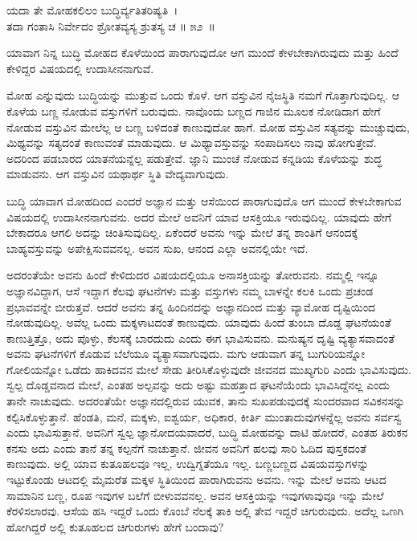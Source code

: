 \begin{shloka}
ಯದಾ ತೇ ಮೋಹಕಲಿಲಂ ಬುದ್ಧಿರ್ವ್ಯತಿತರಿಷ್ಯತಿ~।\\ತದಾ ಗಂತಾಸಿ ನಿರ್ವೇದಂ ಶ್ರೋತವ್ಯಸ್ಯ ಶ್ರುತಸ್ಯ ಚ \hfill॥ ೫೨~॥
\end{shloka}

\begin{artha}
ಯಾವಾಗ ನಿನ್ನ ಬುದ್ಧಿ ಮೋಹದ ಕೊಳೆಯಿಂದ ಪಾರಾಗುವುದೋ ಆಗ ಮುಂದೆ ಕೇಳಬೇಕಾಗಿರುವುದು ಮತ್ತು ಹಿಂದೆ ಕೇಳಿದ್ದರ ವಿಷಯದಲ್ಲಿ ಉದಾಸೀನನಾಗುವೆ.
\end{artha}

ಮೋಹ ಎನ್ನುವುದು ಬುದ್ಧಿಯನ್ನು ಮುತ್ತುವ ಒಂದು ಕೊಳೆ. ಆಗ ವಸ್ತುವಿನ ನೈಜಸ್ಥಿತಿ ನಮಗೆ ಗೊತ್ತಾಗುವುದಿಲ್ಲ. ಆ ಕೊಳೆಯ ಬಣ್ಣ ನೋಡುವ ವಸ್ತುಗಳಿಗೆ ಬರುವುದು. ನಾವೊಂದು ಬಣ್ಣದ ಗಾಜಿನ ಮೂಲಕ ನೋಡಿದಾಗ ಹೇಗೆ ನೋಡುವ ವಸ್ತುವಿನ ಮೇಲೆಲ್ಲ ಆ ಬಣ್ಣ ಬಳಿದಂತೆ ಕಾಣುವುದೋ ಹಾಗೆ. ಮೋಹ ವಸ್ತುವಿನ ಸತ್ಯವನ್ನು ಮುಚ್ಚುವುದು, ಮಿಥ್ಯವನ್ನು ಸತ್ಯದಂತೆ ಕಾಣುವಂತೆ ಮಾಡುವುದು. ಆ ಮಿಥ್ಯಾವಸ್ತುವನ್ನು ಸಂಪಾದಿಸಲು ನಾವು ಹೋಗುತ್ತೇವೆ. ಅದರಿಂದ ಪಡಬಾರದ ಯಾತನೆಯನ್ನೆಲ್ಲ ಪಡುತ್ತೇವೆ. ಜ್ಞಾನಿ ಮುಂಚೆ ನೋಡುವ ಕನ್ನಡಿಯ ಕೊಳೆಯನ್ನು ಶುದ್ಧ ಮಾಡುವನು. ಆಗ ವಸ್ತುವಿನ ಯಥಾರ್ಥ ಸ್ಥಿತಿ ವೇದ್ಯವಾಗುವುದು.

ಬುದ್ಧಿ ಯಾವಾಗ ಮೋಹದಿಂದ ಎಂದರೆ ಅಜ್ಞಾನ ಮತ್ತು ಆಸೆಯಿಂದ ಪಾರಾಗುವುದೊ ಆಗ ಮುಂದೆ ಕೇಳಬೇಕಾಗುವ ವಿಷಯದಲ್ಲಿ ಉದಾಸೀನನಾಗುವನು. ಅದರ ಮೇಲೆ ಅವನಿಗೆ ಯಾವ ಆಸಕ್ತಿಯೂ ಇರುವುದಿಲ್ಲ. ಯಾವುದು ಹೇಗೆ ಬೇಕಾದರೂ ಆಗಲಿ ಅದನ್ನು ಚಿಂತಿಸುವುದಿಲ್ಲ. ಏಕೆಂದರೆ ಅವನು ಇನ್ನು ಮೇಲೆ ತನ್ನ ಶಾಂತಿಗೆ ಆನಂದಕ್ಕೆ ಬಾಹ್ಯವಸ್ತುವನ್ನು ಅಪೇಕ್ಷಿಸುವವನಲ್ಲ. ಅವನ ಸುಖ, ಆನಂದ ಎಲ್ಲಾ ಅವನಲ್ಲಿಯೇ ಇದೆ.

ಅದರಂತೆಯೇ ಅವನು ಹಿಂದೆ ಕೇಳಿದುದರ ವಿಷಯದಲ್ಲಿಯೂ ಅನಾಸಕ್ತಿಯನ್ನು ತೋರುವನು. ನಮ್ಮಲ್ಲಿ ಇನ್ನೂ ಅಜ್ಞಾನವಿದ್ದಾಗ, ಆಸೆ ಇದ್ದಾಗ ಕೆಲವು ಘಟನೆಗಳು ಮತ್ತು ವಸ್ತುಗಳು ನಮ್ಮ ಬಾಳನ್ನೇ ಕಲಕಿ ಒಂದು ಪ್ರಚಂಡ ಪ್ರಭಾವವನ್ನೇ ಬೀರುತ್ತವೆ. ಆದರೆ ಅವನು ತನ್ನ ಹಿಂದಿನದನ್ನು ಅಜ್ಞಾನದಿಂದ ಮತ್ತು ವ್ಯಾಮೋಹ ದೃಷ್ಟಿಯಿಂದ ನೋಡುವುದಿಲ್ಲ. ಅವೆಲ್ಲ ಒಂದು ಮಕ್ಕಳಾಟದಂತೆ ಕಾಣುವುದು. ಯಾವುದು ಹಿಂದೆ ತುಂಬಾ ದೊಡ್ಡ ಘಟನೆಯಂತೆ ಕಾಣುತ್ತಿತ್ತೊ, ಅದು ಪೊಳ್ಳು, ಕೆಲಸಕ್ಕೆ ಬಾರದುದು ಎಂದು ಈಗ ಭಾವಿಸುವನು. ಮನುಷ್ಯನ ದೃಷ್ಟಿ ವ್ಯತ್ಯಾಸವಾದಂತೆ ಅವನು ಘಟನೆಗಳಿಗೆ ಕೊಡುವ ಬೆಲೆಯೂ ವ್ಯತ್ಯಾಸವಾಗುವುದು. ಮಗು ಆಡುವಾಗ ತನ್ನ ಬುಗುರಿಯನ್ನೋ ಗೋಲಿಯನ್ನೋ ಒಡೆದು ಹಾಕಿದವನ ಮೇಲೆ ಸೇಡು ತೀರಿಸಿಕೊಳ್ಳುವುದೇ ಜೀವನದ ಮುಖ್ಯಗುರಿ ಎಂದು ಭಾವಿಸುವುದು. ಸ್ವಲ್ಪ ದೊಡ್ಡವನಾದ ಮೇಲೆ, ಎಂತಹ ಅಲ್ಪವನ್ನು ಅದು ಅಷ್ಟು ಮಹತ್ತಾದ ಘಟನೆಯೆಂದು ಭಾವಿಸಿದ್ದೆನಲ್ಲ ಎಂದು ತಾನೇ ನಾಚುವುದು. ಅದರಂತೆಯೇ ಅಜ್ಞಾನದಲ್ಲಿರುವ ಯುವಕ, ತಾನು ಸುಖಪಡುವುದಕ್ಕೆ ಸುಂದರವಾದ ಸವಿಕನಸನ್ನು ಕಲ್ಪಿಸಿಕೊಳ್ಳುತ್ತಾನೆ. ಹೆಂಡತಿ, ಮನೆ, ಮಕ್ಕಳು, ಐಶ್ವರ್ಯ, ಅಧಿಕಾರ, ಕೀರ್ತಿ ಮುಂತಾದುವುಗಳನ್ನೆಲ್ಲ ಅವನು ಸರ್ವಸ್ವ ಎಂದು ಭಾವಿಸುತ್ತಾನೆ. ಅವನಿಗೆ ಸ್ವಲ್ಪ ಜ್ಞಾನೋದಯವಾದರೆ, ಬುದ್ಧಿ ಮೋಹವನ್ನು ದಾಟಿ ಹೋದರೆ, ಎಂತಹ ತಿರುಕನ ಕನಸು ಅದು ಎಂದು ತಾನೆ ತನ್ನ ಕಲ್ಪನೆಗೆ ನಾಚುತ್ತಾನೆ. ಜೀವನ ಅವನಿಗೆ ಹಲವು ಸಾರಿ ಓದಿದ ಪುಸ್ತಕದಂತೆ ಕಾಣುವುದು. ಅಲ್ಲಿ ಯಾವ ಕುತೂಹಲವೂ ಇಲ್ಲ, ಉದ್ವಿಗ್ನತೆಯೂ ಇಲ್ಲ. ಬಣ್ಣಬಣ್ಣದ ವಿಷಯವಸ್ತುಗಳನ್ನು ಇಟ್ಟುಕೊಂಡು ಆಟದಲ್ಲಿ ಮೈಮರೆತ ಮಕ್ಕಳ ಸ್ಥಿತಿಯಿಂದ ಪಾರಾಗಿರುವನು ಅವನು. ಇನ್ನು ಮೇಲೆ ಅವನು ಆಟದ ಸಾಮಾನಿನ ಬಣ್ಣ, ರೂಪ ಇವುಗಳ ಬಲೆಗೆ ಬೀಳುವವನಲ್ಲ. ಅವನ ಆಸಕ್ತಿಯನ್ನು ಇವುಗಳಾವುವೂ ಇನ್ನು ಮೇಲೆ ಕೆರಳಿಸಲಾರವು. ಆಸೆಯ ಹಸಿ ಇದ್ದರೆ ಒಂದು ಕೊಂಬೆ ನೆಲಕ್ಕೆ ತಾಕಿ ಅಲ್ಲಿ ತೇವ ಇದ್ದರೆ ಚಿಗುರುವುದು. ಅದೆಲ್ಲ ಒಣಗಿ ಹೋಗಿದ್ದರೆ ಅಲ್ಲಿ ಕುತೂಹಲದ ಚಿಗುರುಗಳು ಹೇಗೆ ಬಂದಾವು?

